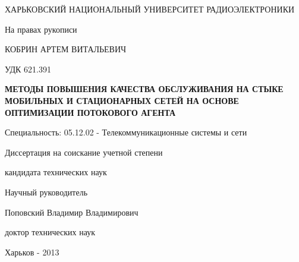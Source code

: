 \begin{titlepage}

 ХАРЬКОВСКИЙ НАЦИОНАЛЬНЫЙ УНИВЕРСИТЕТ РАДИОЭЛЕКТРОНИКИ

 \vspace*{3.5em plus .6em minus .5em}
\begin{flushright}
 На правах рукописи
\end{flushright}

 \vspace*{3.5em plus .6em minus .5em}
\MakeUppercase{Кобрин Артем Витальевич}

 \vspace*{1.5em plus .6em minus .5em}
\begin{flushright}
 УДК 621.391
\end{flushright}

 \vspace*{1.5em plus .6em minus .5em}
\MakeUppercase{\textbf{Методы повышения качества обслуживания на стыке мобильных и стационарных сетей на основе оптимизации 
потокового агента}}

 \vspace*{3.5em plus .6em minus .5em}
Специальность: 05.12.02 - Телекоммуникационные системы и сети
 \vspace*{3.5em plus .6em minus .5em}
 
 Диссертация на соискание учетной степени 
 
 кандидата технических наук

  \vspace*{3em plus .6em minus .5em}
\begin{flushleft}

\hangindent=8cm  \noindent
 Научный руководитель

 Поповский Владимир Владимирович

 доктор технических наук
 
 \vspace*{3em plus .6em minus .5em}
 


\end{flushleft}

 
  \vspace*{2em plus .6em minus .5em}
 Харьков - 2013
 
\end{titlepage}
